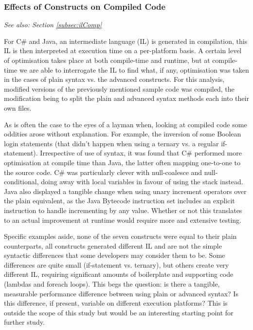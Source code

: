 \documentclass{article}
\begin{document}
        \subsubsection{Effects of Constructs on Compiled Code}
            \textit{See also: Section \ref{subsec:ilComp}}
            \newline

            \noindent For C\# and Java, an intermediate language (IL) is generated in compilation, this IL is then interpreted at execution time on a per-platform basis. A certain level of optimisation takes place at both compile-time and runtime, but at compile-time we are able to interrogate the IL to find what, if any, optimisation was taken in the cases of plain syntax vs. the advanced constructs. For this analysis, modified versions of the previously mentioned sample code was compiled, the modification being to split the plain and advanced syntax methods each into their own files.

            As is often the case to the eyes of a layman when, looking at compiled code some oddities arose without explanation. For example, the inversion of some Boolean login statements (that didn't happen when using a ternary vs. a regular if-statement). Irrespective of use of syntax, it was found that C\# performed more optimisation at compile time than Java, the latter often mapping one-to-one to the source code. C\# was particularly clever with null-coalesce and null-conditional, doing away with local variables in favour of using the stack instead. Java also displayed a tangible change when using unary increment operators over the plain equivalent, as the Java Bytecode instruction set includes an explicit instruction to handle incrementing by any value. Whether or not this translates to an actual improvement at runtime would require more and extensive testing.

            Specific examples aside, none of the seven constructs were equal to their plain counterparts, all constructs generated different IL and are not the simple syntactic differences that some developers may consider them to be. Some differences are quite small (if-statement vs. ternary), but others create very different IL, requiring significant amounts of boilerplate and supporting code (lambdas and foreach loops). This begs the question: is there a tangible, measurable performance difference between using plain or advanced syntax? Is this difference, if present, variable on different execution platforms? This is outside the scope of this study but would be an interesting starting point for further study.
\end{document}
